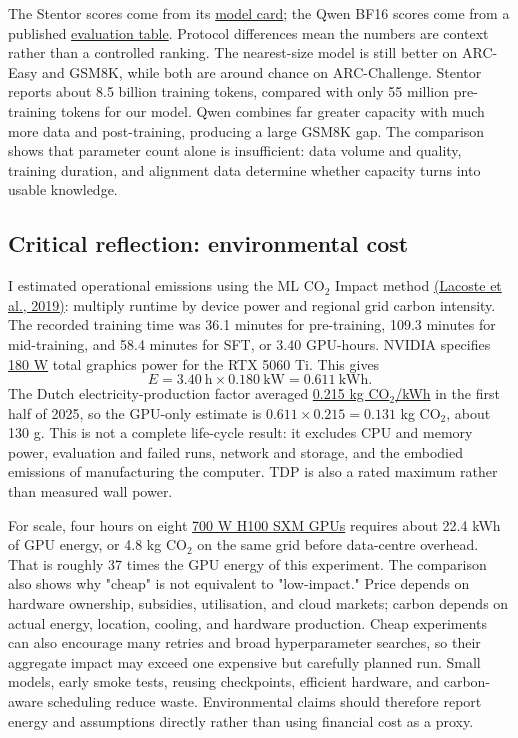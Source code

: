 \documentclass{article}
\begin{document}
The Stentor scores come from its
\href{https://huggingface.co/StentorLabs/Stentor3-20M/blob/main/README.md}{model
card}; the Qwen BF16 scores come from a published
\href{https://huggingface.co/OPEA/Qwen2.5-0.5B-Instruct-int4-sym-inc/blob/7cac2d1805faa26fa70b1004ad977bcc5af571b6/README.md}{evaluation
table}. Protocol differences mean the numbers are context rather than a
controlled ranking. The nearest-size model is still better on ARC-Easy and
GSM8K, while both are around chance on ARC-Challenge. Stentor reports about
8.5 billion training tokens, compared with only 55 million pre-training tokens
for our model. Qwen combines far greater capacity with much more data and
post-training, producing a large GSM8K gap. The comparison shows that parameter
count alone is insufficient: data volume and quality, training duration, and
alignment data determine whether capacity turns into usable knowledge.

\subsection{Critical reflection: environmental cost}

I estimated operational emissions using the ML CO$_2$ Impact method
\href{https://arxiv.org/abs/1910.09700}{(Lacoste et al., 2019)}: multiply
runtime by device power and regional grid carbon intensity. The recorded
training time was 36.1 minutes for pre-training, 109.3 minutes for
mid-training, and 58.4 minutes for SFT, or 3.40 GPU-hours. NVIDIA specifies
\href{https://www.nvidia.com/en-us/geforce/graphics-cards/50-series/rtx-5060-family/}{180 W}
total graphics power for the RTX 5060 Ti. This gives
\[
E = 3.40\ \mathrm{h}\times0.180\ \mathrm{kW}=0.611\ \mathrm{kWh}.
\]
The Dutch electricity-production factor averaged
\href{https://ned.nl/nl/achtergrond/halfjaaroverzicht-energiedata}{0.215
kg CO$_2$/kWh} in the first half of 2025, so the GPU-only estimate is
$0.611\times0.215=0.131$ kg CO$_2$, about 130 g. This is not a complete
life-cycle result: it excludes CPU and memory power, evaluation and failed
runs, network and storage, and the embodied emissions of manufacturing the
computer. TDP is also a rated maximum rather than measured wall power.

For scale, four hours on eight
\href{https://www.nvidia.com/en-eu/data-center/h100/}{700 W H100 SXM GPUs}
requires about 22.4 kWh of GPU energy, or 4.8 kg CO$_2$ on the same grid before
data-centre overhead.
That is roughly 37 times the GPU energy of this experiment. The comparison
also shows why "cheap" is not equivalent to "low-impact." Price depends on
hardware ownership, subsidies, utilisation, and cloud markets; carbon depends
on actual energy, location, cooling, and hardware production. Cheap experiments
can also encourage many retries and broad hyperparameter searches, so their
aggregate impact may exceed one expensive but carefully planned run. Small
models, early smoke tests, reusing checkpoints, efficient hardware, and
carbon-aware scheduling reduce waste. Environmental claims should therefore
report energy and assumptions directly rather than using financial cost as a
proxy.
\end{document}
